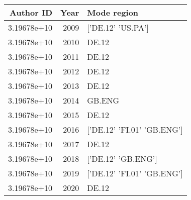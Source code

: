 \begin{tabular}{rrl}
\hline
   Author ID &   Year & Mode region                \\
\hline
 3.19678e+10 &   2009 & ['DE.12' 'US.PA']          \\
 3.19678e+10 &   2010 & DE.12                      \\
 3.19678e+10 &   2011 & DE.12                      \\
 3.19678e+10 &   2012 & DE.12                      \\
 3.19678e+10 &   2013 & DE.12                      \\
 3.19678e+10 &   2014 & GB.ENG                     \\
 3.19678e+10 &   2015 & DE.12                      \\
 3.19678e+10 &   2016 & ['DE.12' 'FI.01' 'GB.ENG'] \\
 3.19678e+10 &   2017 & DE.12                      \\
 3.19678e+10 &   2018 & ['DE.12' 'GB.ENG']         \\
 3.19678e+10 &   2019 & ['DE.12' 'FI.01' 'GB.ENG'] \\
 3.19678e+10 &   2020 & DE.12                      \\
\hline
\end{tabular}